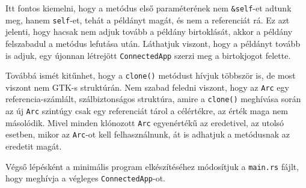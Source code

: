 

Itt fontos kiemelni, hogy a metódus első paraméterének nem \texttt{\&self}-et adtunk meg,
hanem \texttt{self}-et, tehát a példányt magát, és nem a referenciát rá.
Ez azt jelenti, hogy hacsak nem adjuk tovább a példány birtoklását, akkor a példány felszabadul
a metódus lefutása után.
Láthatjuk viszont, hogy a példányt tovább is adjuk, egy újonnan létrejött \texttt{ConnectedApp}
szerzi meg a birtokjogot felette.

Továbbá ismét kitűnhet, hogy a \texttt{clone()} metódust hívjuk többször is,
de most viszont nem GTK-s struktúrán.
Nem szabad feledni viszont, hogy az \texttt{Arc} egy referencia-számlált, szálbiztonságos struktúra, 
amire a \texttt{clone()} meghívása során az új \texttt{Arc} szintúgy csak egy referenciát tárol
a célértékre, az érték maga nem másolódik.
Mivel minden klónozott \texttt{Arc} egyenértékű az eredetivel, az utolsó esetben, mikor az \texttt{Arc}-ot
kell felhasználnunk, át is adhatjuk a metódusnak az eredetit magát.

Végső lépésként a minimális program elkészítéséhez módosítjuk a \texttt{main.rs} fájlt,
hogy meghívja a végleges \texttt{ConnectedApp}-ot.

